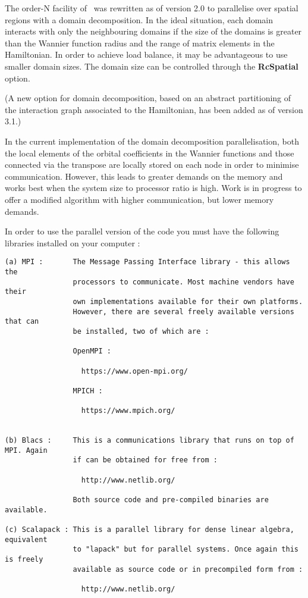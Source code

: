 The order-N facility of \siesta\ was rewritten as of version 2.0
to parallelise over spatial regions with a domain decomposition. In the
ideal situation, each domain interacts with only the neighbouring domains
if the size of the domains is greater than the Wannier function radius and
the range of matrix elements in the Hamiltonian. In order to achieve load
balance, it may be advantageous to use smaller domain sizes. The domain
size can be controlled through the \textbf{RcSpatial} option.

(A new option for domain decomposition, based on an abstract
partitioning of the interaction graph associated to the Hamiltonian,
has been added as of version 3.1.)

In the current implementation of the domain decomposition parallelisation,
both the local elements of the orbital coefficients in the Wannier functions
and those connected via the transpose are locally stored on each node in order
to minimise communication. However, this leads to greater demands on the memory
and works best when the system size to processor ratio is high. Work is in
progress to offer a modified algorithm with higher communication, but lower
memory demands.

In order to use the parallel version of the code you must have the following
libraries installed on your computer :

\begin{verbatim}
(a) MPI :       The Message Passing Interface library - this allows the
                processors to communicate. Most machine vendors have their
                own implementations available for their own platforms.
                However, there are several freely available versions that can
                be installed, two of which are :

                OpenMPI :

                  https://www.open-mpi.org/

                MPICH :

                  https://www.mpich.org/


(b) Blacs :     This is a communications library that runs on top of MPI. Again
                if can be obtained for free from :

                  http://www.netlib.org/

                Both source code and pre-compiled binaries are available.

(c) Scalapack : This is a parallel library for dense linear algebra, equivalent
                to "lapack" but for parallel systems. Once again this is freely
                available as source code or in precompiled form from :

                  http://www.netlib.org/
\end{verbatim}

